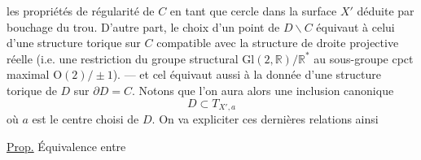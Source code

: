 
les propriétés de régularité de $C$ en tant que cercle  dans la surface   $X'$ déduite par bouchage du trou. D'autre part, le choix d'un point de $D\smallsetminus C$ équivaut à celui d'une structure torique sur $C$ compatible avec la structure de droite projective réelle (i.e. une restriction du groupe structural  $\mathrm{Gl}(2,\mathbb R)/\mathbb R^{*}$ au sous-groupe cpct maximal $\mathrm O(2)/\pm1$).
--- et cel équivaut aussi à la donnée d'une structure torique de $D$ sur  $\partial D=C$. Notons que l'on aura alors une inclusion canonique
\[
D\subset T_{X',a}
\]
où $a$ est le centre choisi de $D$. On va expliciter  ces dernières relations ainsi

\uline{Prop.} Équivalence entre 
